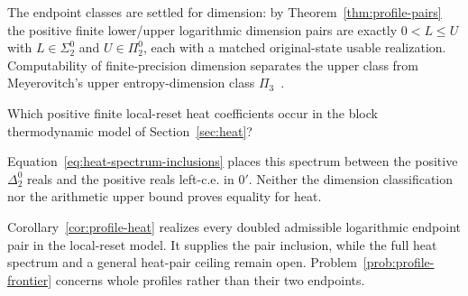The endpoint classes are settled for dimension: by Theorem~\ref{thm:profile-pairs} the positive finite lower/upper logarithmic dimension pairs are exactly $0<L\le U$ with $L\in\Sigma^0_2$ and $U\in\Pi^0_2$, each with a matched original-state usable realization. Computability of finite-precision dimension separates the upper class from Meyerovitch's upper entropy-dimension class $\Pi_3$~\cite[Theorem~5.1]{Mey11}.
\setcounter{theorem}{5}

\begin{problem}\label{prob:heat-spectrum}
Which positive finite local-reset heat coefficients occur in the block thermodynamic model of Section~\ref{sec:heat}?
\end{problem}
Equation~\eqref{eq:heat-spectrum-inclusions} places this spectrum between the positive $\Delta^0_2$ reals and the positive reals left-c.e. in $0'$. Neither the dimension classification nor the arithmetic upper bound proves equality for heat.

Corollary~\ref{cor:profile-heat} realizes every doubled admissible logarithmic endpoint pair in the local-reset model. It supplies the pair inclusion, while the full heat spectrum and a general heat-pair ceiling remain open. Problem~\ref{prob:profile-frontier} concerns whole profiles rather than their two endpoints.
